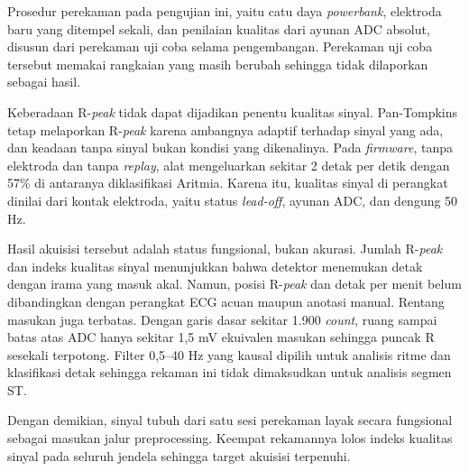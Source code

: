 Prosedur perekaman pada pengujian ini, yaitu catu daya \textit{powerbank}, elektroda baru yang ditempel sekali, dan penilaian kualitas dari ayunan ADC absolut, disusun dari perekaman uji coba selama pengembangan. Perekaman uji coba tersebut memakai rangkaian yang masih berubah sehingga tidak dilaporkan sebagai hasil.

Keberadaan R-\textit{peak} tidak dapat dijadikan penentu kualitas sinyal. Pan-Tompkins tetap melaporkan R-\textit{peak} karena ambangnya adaptif terhadap sinyal yang ada, dan keadaan tanpa sinyal bukan kondisi yang dikenalinya. Pada \textit{firmware}, tanpa elektroda dan tanpa \textit{replay}, alat mengeluarkan sekitar 2 detak per detik dengan 57\% di antaranya diklasifikasi Aritmia. Karena itu, kualitas sinyal di perangkat dinilai dari kontak elektroda, yaitu status \textit{lead-off}, ayunan ADC, dan dengung 50 Hz.

Hasil akuisisi tersebut adalah status fungsional, bukan akurasi. Jumlah R-\textit{peak} dan indeks kualitas sinyal menunjukkan bahwa detektor menemukan detak dengan irama yang masuk akal. Namun, posisi R-\textit{peak} dan detak per menit belum dibandingkan dengan perangkat ECG acuan maupun anotasi manual. Rentang masukan juga terbatas. Dengan garis dasar sekitar 1.900 \textit{count}, ruang sampai batas atas ADC hanya sekitar 1,5 mV ekuivalen masukan sehingga puncak R sesekali terpotong. Filter 0,5--40 Hz yang kausal dipilih untuk analisis ritme dan klasifikasi detak sehingga rekaman ini tidak dimaksudkan untuk analisis segmen ST.

Dengan demikian, sinyal tubuh dari satu sesi perekaman layak secara fungsional sebagai masukan jalur preprocessing. Keempat rekamannya lolos indeks kualitas sinyal pada seluruh jendela sehingga target akuisisi terpenuhi.


